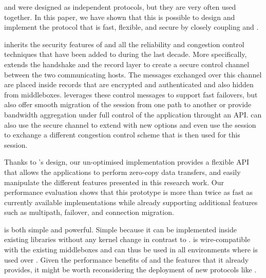 \tcp and \tls were designed as independent protocols, but they are very often
used together. In this paper, we have shown that this is possible to design and
implement the \tcpls protocol that is fast, flexible, and secure by closely
coupling \tcp and \tls.

\tcpls inherits the security features of  and all the reliability and
congestion control techniques that have been added to \tcp during the last
decade. More specifically, \tcpls extends the  handshake and the record
layer to create a secure control channel between the two communicating hosts.
The messages exchanged over this channel are placed inside \tls records that are
encrypted and authenticated and also hidden from middleboxes. \tcpls leverages
these control messages to support fast failovers, but also offer smooth
migration of the \tcpls session from one path to another or provide bandwidth
aggregation under full control of the application throught an API. \tcpls can
also use the secure channel to extend \tcp with new options and even use the
\tcpls session to exchange a different congestion control scheme that is then
used for this session.

Thanks to \tcpls's design, our un-optimised \tcpls implementation provides a
flexible API that allows the applications to perform zero-copy data transfers,
and easily manipulate the different features presented in this research work.
Our performance evaluation shows that this prototype is more than twice as fast
as currently available \quic implementations while already supporting additional
features such as multipath, failover, and connection migration.

\tcpls is both simple and powerful. Simple because it can be implemented inside
existing \tls libraries without any kernel change in contrast to \tcp. \tcpls is
wire-compatible with the existing \tcp middleboxes and can thus be used in all
environments where \tls is used over \tcp. Given the performance benefits of
\tcpls and the features that it already provides, it might be worth
reconsidering the deployment of new protocols like \quic.
